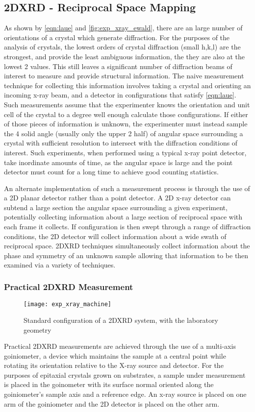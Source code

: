 \subsection{2DXRD - Reciprocal Space Mapping}
\label{sec:2DXRD} As shown by \cref{eqn:laue} and \cref{fig:exp_xray_ewald}, there are an large number of orientations of a crystal which generate diffraction. For the purposes of the analysis of crystals, the lowest orders of crystal diffraction (small h,k,l) are the strongest, and provide the least ambiguous information, the they are also at the lowest 2\texttheta{} values. This still leaves a significant number of diffraction beams of interest to measure and provide structural information. The naive measurement technique for collecting this information involves taking a crystal and orienting an incoming x-ray beam, and a detector in configurations that satisfy \cref{eqn:laue}. Such measurements assume that the experimenter knows the orientation and unit cell of the crystal to a degree well enough calculate those configurations. If either of those pieces of information is unknown, the experimenter must instead sample the 4\textpi{} solid angle (usually only the upper 2\textpi{} half) of angular space surrounding a crystal with sufficient resolution to intersect with the diffraction conditions of interest. Such experiments, when performed using a typical x-ray point detector, take inordinate amounts of time, as the angular space is large and the point detector must count for a long time to achieve good counting statistics.

An alternate implementation of such a measurement process is through the use of a 2D planar detector rather than a point detector. A 2D x-ray detector can subtend a large section the angular space surrounding a given experiment, potentially collecting information about a large section of reciprocal space with each frame it collects. If configuration is then swept through a range of diffraction conditions, the 2D detector will collect information about a wide swath of reciprocal space. 2DXRD techniques simultaneously collect information about the phase and symmetry of an unknown sample allowing that information to be then examined via a variety of techniques.

\subsubsection{Practical 2DXRD Measurement}
\begin{figure}
    \centering
    \texttt{[image: exp\_xray\_machine]}
    \caption[2DXRD diagram]{\label{fig:exp_xray_machine}Standard configuration of a 2DXRD system, with the laboratory geometry\cite{bobhe}}
\end{figure}
Practical 2DXRD measurements are achieved through the use of a multi-axis goiniometer, a device which maintains the sample at a central point while rotating its orientation relative to the X-ray source and detector. For the purposes of epitaxial crystals grown on substrates, a sample under measurement is placed in the goinometer with its surface normal oriented along the goiniometer's sample axis and a reference edge. An x-ray source is placed on one arm of the goiniometer and the 2D detector is placed on the other arm.

